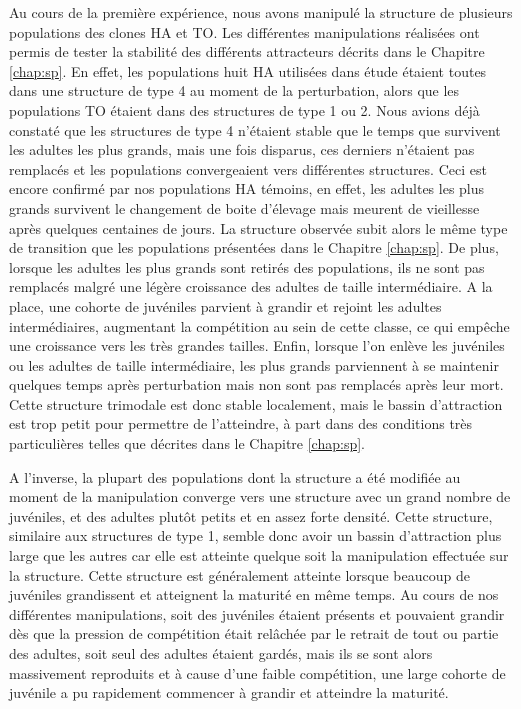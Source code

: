 Au cours de la première expérience, nous avons manipulé la structure de
plusieurs populations des clones HA et TO. Les différentes manipulations
réalisées ont permis de tester la stabilité des différents attracteurs décrits
dans le Chapitre \ref{chap:sp}. En effet, les populations huit HA utilisées
dans étude étaient toutes dans une structure de type 4 au moment de la
perturbation, alors que les populations TO étaient dans des structures de type 1
ou 2. Nous avions déjà constaté que les structures de type 4 n'étaient stable
que le temps que survivent les adultes les plus grands, mais une fois disparus,
ces derniers n'étaient pas remplacés et les populations convergeaient vers
différentes structures. Ceci est encore confirmé par nos populations HA témoins,
en effet, les adultes les plus grands survivent le changement de boite d'élevage
mais meurent de vieillesse après quelques centaines de jours. La structure
observée subit alors le même type de transition que les populations présentées
dans le Chapitre \ref{chap:sp}. De plus, lorsque les adultes les plus grands
sont retirés des populations, ils ne sont pas remplacés malgré une légère
croissance des adultes de taille intermédiaire. A la place, une cohorte de
juvéniles parvient à grandir et rejoint les adultes intermédiaires, augmentant
la compétition au sein de cette classe, ce qui empêche une croissance vers les
très grandes tailles. Enfin, lorsque l'on enlève les juvéniles ou les adultes
de taille intermédiaire, les plus grands parviennent à se maintenir quelques
temps après perturbation mais non sont pas remplacés après leur mort. Cette
structure trimodale est donc stable localement, mais le bassin d'attraction est
trop petit pour permettre de l'atteindre, à part dans des conditions très
particulières telles que décrites dans le Chapitre \ref{chap:sp}.

A l'inverse, la plupart des populations dont la structure a été modifiée au
moment de la manipulation converge vers une structure avec un grand nombre de
juvéniles, et des adultes plutôt petits et en assez forte densité. Cette
structure, similaire aux structures de type 1, semble donc avoir un bassin
d'attraction plus large que les autres car elle est atteinte quelque soit la
manipulation effectuée sur la structure. Cette structure est généralement
atteinte lorsque beaucoup de juvéniles grandissent et atteignent la maturité en
même temps. Au cours de nos différentes manipulations, soit des juvéniles
étaient présents et pouvaient grandir dès que la pression de compétition était
relâchée par le retrait de tout ou partie des adultes, soit seul des adultes
étaient gardés, mais ils se sont alors massivement reproduits et à cause d'une
faible compétition, une large cohorte de juvénile a pu rapidement commencer à
grandir et atteindre la maturité. 

